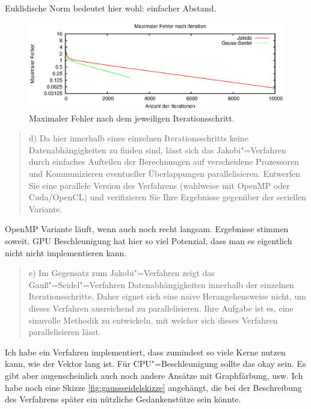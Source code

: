\documentclass[paper = a4]{scrartcl}
\begin{document}
Euklidische Norm bedeutet hier wohl: einfacher Abstand.

\begin{figure}
    \centering
    \includegraphics[width=\textwidth]{fehler}
    \caption{Maximaler Fehler nach dem jeweiligen Iterationsschritt.}
    \label{fig:fehler}
\end{figure}

\begin{quote}
    d) Da hier innerhalb eines einzelnen Iterationsschritts keine Datenabhängigkeiten zu finden sind, lässt sich das Jakobi"=Verfahren durch einfaches Aufteilen der Berechnungen auf verscheidene Prozessoren und Kommunizieren eventueller Überlappungen parallelisieren. Entwerfen Sie eine parallele Version des Verfahrens (wahlweise mit OpenMP oder Cuda/OpenCL) und verifizieren Sie Ihre Ergebnisse gegenüber der seriellen Variante.
\end{quote}

OpenMP Variante läuft, wenn auch noch recht langsam. Ergebnisse stimmen soweit. GPU Beschleunigung hat hier so viel Potenzial, dass man es eigentlich nicht nicht implementieren kann.

\begin{quote}
    e) Im Gegensatz zum Jakobi"=Verfahren zeigt das Gauß"=Seidel"=Verfahren Datenabhängigkeiten innerhalb der einzelnen Iterationsschritte. Daher eignet sich eine naive Herangehensweise nicht, um dieses Verfahren ausreichend zu parallelisieren. Ihre Aufgabe ist es, eine sinnvolle Methodik zu entwickeln, mit welcher sich dieses Verfahren parallelisieren lässt.
\end{quote}

Ich habe ein Verfahren implementiert, dass zumindest so viele Kerne nutzen kann, wie der Vektor lang ist. Für CPU"=Beschleunigung sollte das okay sein. Es gibt aber augenscheinlich auch noch andere Ansätze mit Graphfärbung, usw. Ich habe noch eine Skizze \ref{fig:gaussseidelskizze} angehängt, die bei der Beschreibung des Verfahrens später ein nützliche Gedankenstütze sein könnte.
\end{document}
